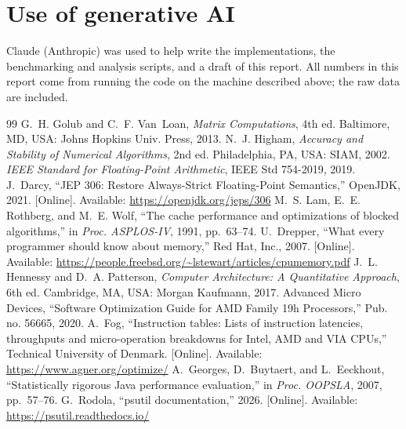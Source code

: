 \documentclass[11pt,a4paper]{article}
\begin{document}
\section*{Use of generative AI}
Claude (Anthropic) was used to help write the implementations, the benchmarking and analysis scripts,
and a draft of this report. All numbers in this report come from running the code on the machine
described above; the raw data are included.

\begin{thebibliography}{99}\small\sloppy
\setlength{\itemsep}{3pt}
 G.~H. Golub and C.~F. Van~Loan, \emph{Matrix Computations}, 4th ed. Baltimore, MD, USA: Johns Hopkins Univ. Press, 2013.
 N.~J. Higham, \emph{Accuracy and Stability of Numerical Algorithms}, 2nd ed. Philadelphia, PA, USA: SIAM, 2002.
 \emph{IEEE Standard for Floating-Point Arithmetic}, IEEE Std 754-2019, 2019.
 J.~Darcy, ``JEP 306: Restore Always-Strict Floating-Point Semantics,'' OpenJDK, 2021. [Online]. Available: \url{https://openjdk.org/jeps/306}
 M.~S. Lam, E.~E. Rothberg, and M.~E. Wolf, ``The cache performance and optimizations of blocked algorithms,'' in \emph{Proc. ASPLOS-IV}, 1991, pp.~63--74.
 U.~Drepper, ``What every programmer should know about memory,'' Red Hat, Inc., 2007. [Online]. Available: \url{https://people.freebsd.org/~lstewart/articles/cpumemory.pdf}
 J.~L. Hennessy and D.~A. Patterson, \emph{Computer Architecture: A Quantitative Approach}, 6th ed. Cambridge, MA, USA: Morgan Kaufmann, 2017.
 Advanced Micro Devices, ``Software Optimization Guide for AMD Family 19h Processors,'' Pub. no. 56665, 2020.
 A.~Fog, ``Instruction tables: Lists of instruction latencies, throughputs and micro-operation breakdowns for Intel, AMD and VIA CPUs,'' Technical University of Denmark. [Online]. Available: \url{https://www.agner.org/optimize/}
 A.~Georges, D.~Buytaert, and L.~Eeckhout, ``Statistically rigorous Java performance evaluation,'' in \emph{Proc. OOPSLA}, 2007, pp.~57--76.
 G.~Rodola, ``psutil documentation,'' 2026. [Online]. Available: \url{https://psutil.readthedocs.io/}
\end{thebibliography}
\end{document}
